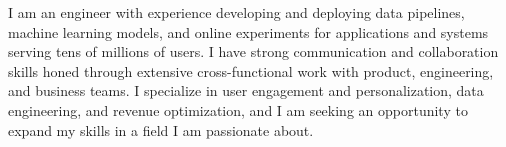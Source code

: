 
I am an engineer with experience developing and deploying data pipelines, machine learning models, and online experiments for applications and systems serving tens of millions of users.
I have strong communication and collaboration skills honed through extensive cross-functional work with product, engineering, and business teams. 
I specialize in user engagement and personalization, data engineering, and revenue optimization, and I am seeking an opportunity to expand my skills in a field I am passionate about. 